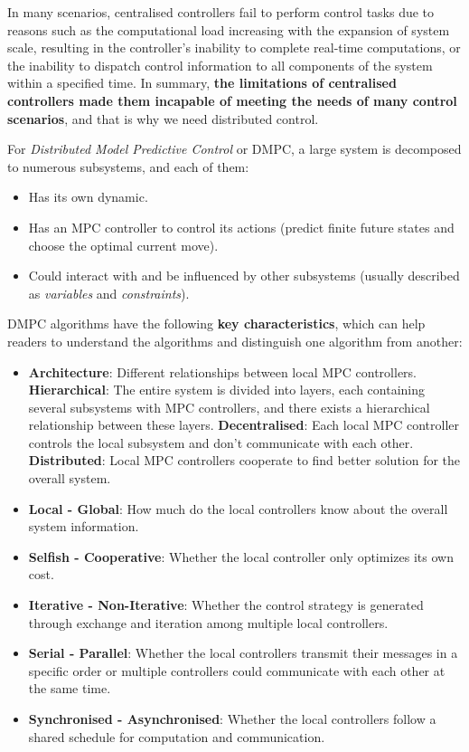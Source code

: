 {%


In many scenarios, centralised controllers fail to perform control tasks due to reasons such as the computational load increasing with the expansion of system scale, 
resulting in the controller's inability to complete real-time computations, 
or the inability to dispatch control information to all components of the system within a specified time. 
In summary, \textbf{the limitations of centralised controllers made them incapable of meeting the needs of many control scenarios}, and that is why we need distributed control.

For \textit{Distributed Model Predictive Control} or DMPC, a large system is decomposed to numerous subsystems, and each of them:
\begin{itemize}
  \item Has its own dynamic.
  \item Has an MPC controller to control its actions (predict finite future states and choose the optimal current move).
  \item Could interact with and be influenced by other subsystems (usually described as \textit{variables} and \textit{constraints}).
\end{itemize}


DMPC algorithms have the following \textbf{key characteristics}, which can help readers to understand the algorithms and distinguish one algorithm from another:

\begin{itemize}
  \item \textbf{Architecture}: Different relationships between local MPC controllers. \textbf{Hierarchical}: The entire system is divided into layers, each containing several subsystems with MPC controllers, and there exists a hierarchical relationship between these layers. \textbf{Decentralised}: Each local MPC controller controls the local subsystem and don't communicate with each other. \textbf{Distributed}: Local MPC controllers cooperate to find better solution for the overall system.   
  \item \textbf{Local - Global}: How much do the local controllers know about the overall system information.
  \item \textbf{Selfish - Cooperative}: Whether the local controller only optimizes its own cost.
  \item \textbf{Iterative - Non-Iterative}: Whether the control strategy is generated through exchange and iteration among multiple local controllers.
  \item \textbf{Serial - Parallel}: Whether the local controllers transmit their messages in a specific order or multiple controllers could communicate with each other at the same time.
  \item \textbf{Synchronised - Asynchronised}: Whether the local controllers follow a shared schedule for computation and communication. 
\end{itemize}

}

